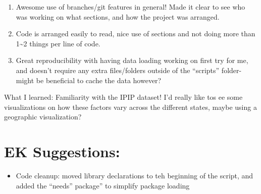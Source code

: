 \documentclass[
]{article}
\providecommand{\tightlist}{%
  \setlength{\itemsep}{0pt}\setlength{\parskip}{0pt}}
\begin{document}
\begin{enumerate}
\def\labelenumi{\arabic{enumi}.}
\tightlist
\item
  Awesome use of branches/git features in general! Made it clear to see who was working on what sections, and how the project was arranged.
\item
  Code is arranged easily to read, nice use of sections and not doing more than 1\textasciitilde2 things per line of code.
\item
  Great reproducibility with having data loading working on first try for me, and doesn't require any extra files/folders outside of the ``scripts'' folder- might be beneficial to cache the data however?
\end{enumerate}

What I learned: Familiarity with the IPIP dataset! I'd really like tos ee some visualizations on how these factors vary across the different states, maybe using a geographic visualization?

\hypertarget{ek-suggestions}{%
\section{EK Suggestions:}\label{ek-suggestions}}

\begin{itemize}
\tightlist
\item
  Code cleanup: moved library declarations to teh beginning of the script, and added the ``needs'' package'' to simplify package loading
\end{itemize}
\end{document}
